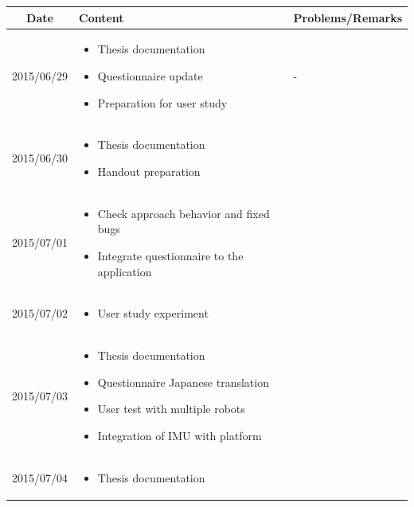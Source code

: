 \documentclass[11pt]{article} %
\begin{document}
\begin{center}
    \begin{longtable}{ | c | p{6cm} | p{5cm} |}
    \hline
    Date & Content & Problems/Remarks \\ 
    \endhead
    \hline    
     2015/06/29         & 
  	\begin{itemize}
  	\item Thesis documentation
  	\item Questionnaire update
  	\item Preparation for user study
	\end{itemize}  
   & - \\
\hline
  										 
 2015/06/30         & 
  \begin{itemize}
  \item Thesis documentation
  \item Handout preparation
\end{itemize}   
& 
 \\
\hline
  										 
  
  2015/07/01        & 
  \begin{itemize}
  \item Check approach behavior and fixed bugs
  \item Integrate questionnaire to the application
  \end{itemize}   
  										 & 
 
  										 \\
  \hline
  
  2015/07/02         & 
  \begin{itemize}
  \item User study experiment
  \end{itemize}
  & 
\\  										 \hline

  2015/07/03         & 
  \begin{itemize}
  \item Thesis documentation
  \item Questionnaire Japanese translation
  \item User test with multiple robots
  \item Integration of IMU with platform
\end{itemize}   
  & 
\\  										 \hline						

  2015/07/04         & 
  \begin{itemize}
  \item Thesis documentation
  \end{itemize}   
  & 
\\  										 \hline								 							 
  										   								 
    \end{longtable}
\end{center}
\end{document}
